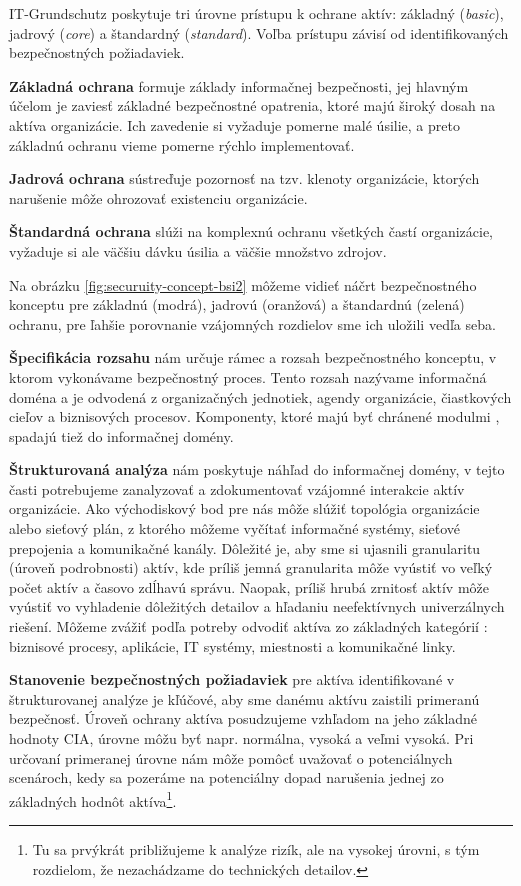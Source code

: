 IT-Grundschutz poskytuje tri úrovne prístupu k ochrane aktív: základný (\emph{basic}), jadrový (\emph{core}) a štandardný
(\emph{standard}). Voľba prístupu závisí od identifikovaných bezpečnostných požiadaviek.

\textbf{Základná ochrana} formuje základy informačnej bezpečnosti, jej hlavným účelom je zaviesť základné bezpečnostné opatrenia,
ktoré majú široký dosah na aktíva organizácie. Ich zavedenie si vyžaduje pomerne malé úsilie, a preto základnú ochranu vieme
pomerne rýchlo implementovať. 

\textbf{Jadrová ochrana} sústreďuje pozornosť na tzv. klenoty organizácie, ktorých narušenie môže ohrozovať existenciu organizácie. 

\textbf{Štandardná ochrana} slúži na komplexnú ochranu všetkých častí organizácie, vyžaduje si ale väčšiu dávku úsilia a
väčšie množstvo zdrojov.

Na obrázku \ref{fig:securuity-concept-bsi2} môžeme vidieť náčrt bezpečnostného konceptu pre
{\color{NavyBlue}základnú (modrá)}, {\color{Orange}jadrovú (oranžová)} a {\color{Green}štandardnú (zelená)} ochranu,
pre ľahšie porovnanie vzájomných rozdielov sme ich uložili vedľa seba.



\textbf{Špecifikácia rozsahu} nám určuje rámec a rozsah bezpečnostného konceptu, v ktorom vykonávame bezpečnostný proces. Tento rozsah nazývame
informačná doména a je odvodená z organizačných jednotiek, agendy organizácie, čiastkových cieľov a biznisových procesov. Komponenty,
ktoré majú byť chránené modulmi \cite{GSK}, spadajú tiež do informačnej domény.

\textbf{Štrukturovaná analýza} nám poskytuje náhľad do informačnej domény, v tejto časti potrebujeme zanalyzovať a zdokumentovať vzájomné interakcie
aktív organizácie. Ako východiskový bod pre nás môže slúžiť topológia organizácie alebo sieťový plán, z ktorého môžeme vyčítať informačné
systémy, sieťové prepojenia a komunikačné kanály. Dôležité je, aby sme si ujasnili granularitu (úroveň podrobnosti) aktív, kde príliš jemná granularita
môže vyústiť vo veľký počet aktív a časovo zdĺhavú správu. Naopak, príliš hrubá zrnitosť aktív môže vyústiť vo vyhladenie dôležitých detailov a hľadaniu
neefektívnych univerzálnych riešení. Môžeme zvážiť podľa potreby odvodiť aktíva zo základných kategórií \cite{GSK}: biznisové procesy, aplikácie,
IT systémy, miestnosti a komunikačné linky.

\textbf{Stanovenie bezpečnostných požiadaviek} pre aktíva identifikované v štrukturovanej analýze je kľúčové, aby sme danému aktívu zaistili primeranú
bezpečnosť. Úroveň ochrany aktíva posudzujeme vzhľadom na jeho základné hodnoty CIA, úrovne môžu byť napr. normálna, vysoká a veľmi vysoká.
Pri určovaní primeranej úrovne nám môže pomôcť uvažovať o potenciálnych scenároch, kedy sa pozeráme na potenciálny dopad narušenia jednej
zo základných hodnôt aktíva\footnote{Tu sa prvýkrát približujeme k analýze rizík, ale na vysokej úrovni, s tým rozdielom, že nezachádzame do technických detailov.}.

